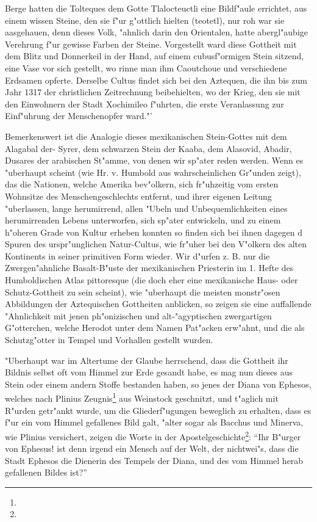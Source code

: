 \documentclass[a4paper, 11pt, oneside, polutonikogreek, german]{article}
\begin{document}
Berge hatten die Tolteques dem Gotte Tlalocteuctli eine Bildf"aule errichtet, aus einem wissen Steine, den sie f"ur g"ottlich hielten (teotetl), nur roh war sie aasgehauen, denn dieses Volk, "ahnlich darin den Orientalen, hatte abergl"aubige Verehrung f"ur gewisse Farben der Steine. Vorgestellt ward diese Gottheit mit dem Blitz und Donnerkeil in der Hand, auf einem cubusf"ormigen Stein sitzend, eine Vase vor sich gestellt, wo rinne man ihm Caoutchoue und verschiedene Erdsamen opferte. Derselbe Cultus findet sich bei den Aztequen, die ihn bis zum Jahr 1317 der christlichen Zeitrechnung beibehielten, wo der Krieg, den sie mit den Einwohnern der Stadt Xochimileo f"uhrten, die erste Veranlassung zur Einf"uhrung der Menschenopfer ward."'

Bemerkenswert ist die Analogie dieses mexikanischen Stein-Gottes mit dem Alagabal der- Syrer, dem schwarzen Stein der Kaaba, dem Alasovid, Abadir, Dusares der arabischen St"amme, von denen wir sp"ater reden werden. Wenn es "uberhaupt scheint (wie Hr. v. Humbold aus wahrscheinlichen Gr"unden zeigt), das die Nationen, welche Amerika bev"olkern, sich fr"uhzeitig vom ersten Wohnsitze des Menschengeschlechts entfernt, und ihrer eigenen Leitung "uberlassen, lange herumirrend, allen "Ubeln und Unbequemlichkeiten eines herumirrenden Lebens unterworfen, sich sp"ater entwickeln, und zu einem h"oheren Grade von Kultur erheben konnten so finden sich bei ihnen dagegen d Spuren des urspr"unglichen Natur-Cultus, wie fr"uher bei den V"olkern des alten Kontinents in seiner primitiven Form wieder. Wir d"urfen z. B. nur die Zwergen"ahnliche Basalt-B"uste der mexikanischen Priesterin im 1. Hefte des Humboldischen Atlas pittoresque (die doch eher eine mexikanische Haus- oder Schutz-Gottheit zu sein scheint), wie "uberhaupt die meisten monstr"osen Abbildungen der Aztequischen Gottheiten anblicken, so zeigen sie eine auffallende "Ahnlichkeit mit jenen ph"onizischen und alt-"agyptischen zwergartigen G"otterchen, welche Herodot unter dem Namen Pat"acken erw"ahnt, und die als Schutzg"otter in Tempel und Vorhallen gestellt wurden.

"Uberhaupt war im Altertume der Glaube herrschend, dass die Gottheit ihr Bildnis selbst oft vom Himmel zur Erde gesandt habe, es mag nun dieses aus Stein oder einem andern Stoffe bestanden haben, so jenes der Diana von Ephesos, welches nach Plinius Zeugnis\footnote{} aus Weinstock geschnitzt, und t"aglich mit R"urden getr"ankt wurde, um die Gliederf"ugungen beweglich zu erhalten, dass es f"ur ein vom Himmel gefallenes Bild galt, "alter sogar als Bacchus und Minerva, wie Plinius versichert, zeigen die Worte in der Apostelgeschichte\footnote{}: "`Ihr B"urger von Ephesus! ist denn irgend ein Mensch auf der Welt, der nichtwei"s, dass die Stadt Ephesos die Dienerin des Tempels der Diana, und des vom Himmel herab gefallenen Bildes ist?"'
\end{document}
